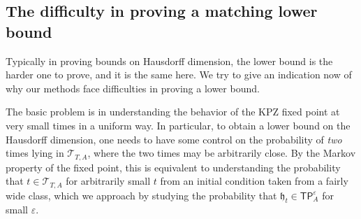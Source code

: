 \documentclass[oneside,final,11pt]{amsart}
\theoremstyle{definition}
\newcommand{\fh}{\mathfrak{h}}
\newcommand{\TP}[1]{\mathsf{TP}_{\!\!#1}}
\newcommand{\CT}{\mathcal{T}}
\newcommand{\1}[1]{\mathbf{1}_{#1}}
\newcommand{\eps}{\varepsilon}
\newcommand{\blue}[1]{{\color{blue}#1}}
\newcommand{\kmtext}[1]{{\color{red}[KM:#1]}}
\numberwithin{equation}{section}
\begin{document}
%
%




\subsection{The difficulty in proving a matching lower bound}\label{sec:why no lower bound}
Typically in proving bounds on Hausdorff dimension, the lower bound is the harder one to prove, and it is the same here. We try to give an indication now of why our methods face difficulties in proving a lower bound.

The basic problem is in understanding the behavior of the KPZ fixed point at very small times in a uniform way. In particular, to obtain a lower bound on the Hausdorff dimension, one needs to have some control on the probability of \emph{two} times lying in $\CT_{T,A}$, where the two times may be arbitrarily close. By the Markov property of the fixed point, this is equivalent to understanding the probability that $t\in\CT_{T,A}$ for arbitrarily small $t$ from an initial condition taken from a fairly wide class, which we approach by studying the probability that $\fh_t\in\TP{A}^\eps$ for small $\varepsilon$.
\end{document}

